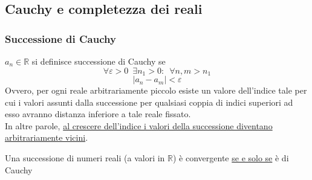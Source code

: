 \documentclass[10pt]{article}
\theoremstyle{plain}
\begin{document}
\subsection{Cauchy e completezza dei reali}
\subsubsection{Successione di Cauchy}
\begin{defin}
$a_n \in \mathbb{R}$ si definisce successione di Cauchy se
\[\forall \varepsilon > 0 \enspace \exists n_1 > 0 : \enspace \forall n, m > n_1\]
\[|a_n - a_m| < \varepsilon\]
Ovvero, per ogni reale arbitrariamente piccolo esiste un valore dell'indice tale per cui i valori assunti dalla successione per qualsiasi coppia di indici superiori ad esso avranno distanza inferiore a tale reale fissato. \\
In altre parole, \underline{al crescere dell'indice i valori della successione diventano arbitrariamente vicini}.
\end{defin}
\begin{ther}
Una successione di numeri reali (a valori in $\mathbb{R}$) è convergente \underline{se e solo se} è di Cauchy
\end{ther}
\end{document}
